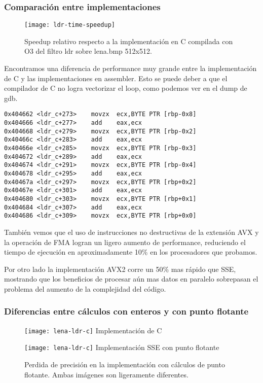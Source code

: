 \subsubsection{Comparación entre implementaciones}

\begin{figure}[H]
    \centering
    \texttt{[image: ldr-time-speedup]}
    \caption{Speedup relativo respecto a la implementación en C compilada con O3 del filtro ldr sobre lena.bmp 512x512.}
    \label{fig:ldr-time-speedup}
\end{figure}

Encontramos una diferencia de performance muy grande entre la implementación de C y las implementaciones en assembler. Esto se puede deber a que el compilador de C no logra vectorizar el loop, como podemos ver en el dump de gdb.

\begin{lstlisting}
0x404662 <ldr_c+273>    movzx  ecx,BYTE PTR [rbp-0x8]
0x404666 <ldr_c+277>    add    eax,ecx
0x404668 <ldr_c+279>    movzx  ecx,BYTE PTR [rbp-0x2]
0x40466c <ldr_c+283>    add    eax,ecx
0x40466e <ldr_c+285>    movzx  ecx,BYTE PTR [rbp-0x3]
0x404672 <ldr_c+289>    add    eax,ecx
0x404674 <ldr_c+291>    movzx  ecx,BYTE PTR [rbp-0x4]
0x404678 <ldr_c+295>    add    eax,ecx
0x40467a <ldr_c+297>    movzx  ecx,BYTE PTR [rbp+0x2]
0x40467e <ldr_c+301>    add    eax,ecx
0x404680 <ldr_c+303>    movzx  ecx,BYTE PTR [rbp+0x1]
0x404684 <ldr_c+307>    add    eax,ecx
0x404686 <ldr_c+309>    movzx  ecx,BYTE PTR [rbp+0x0]
\end{lstlisting}

También vemos que el uso de instrucciones no destructivas de la extensión AVX y la operación de FMA logran un ligero aumento de performance, reduciendo el tiempo de ejecución en aproximadamente 10\% en los procesadores que probamos.

Por otro lado la implementación AVX2 corre un 50\% mas rápido que SSE, mostrando que los beneficios de procesar aún mas datos en paralelo sobrepasan el problema del aumento de la complejidad del código.

\subsubsection{Diferencias entre cálculos con enteros y con punto flotante}

\begin{figure}[H]
    \centering
    \begin{minipage}[t]{0.4\linewidth}
    \centering
    \texttt{[image: lena-ldr-c]}
    Implementación de C
    \end{minipage}
    \hfill
    \begin{minipage}[t]{0.4\linewidth}
    \centering
    \texttt{[image: lena-ldr-c]}
    Implementación SSE con punto flotante
    \end{minipage}
    \caption{Perdida de precisión en la implementación con cálculos de punto flotante. Ambas imágenes son ligeramente diferentes.}
    \label{fig:ldr-perdida-precision}
\end{figure}

